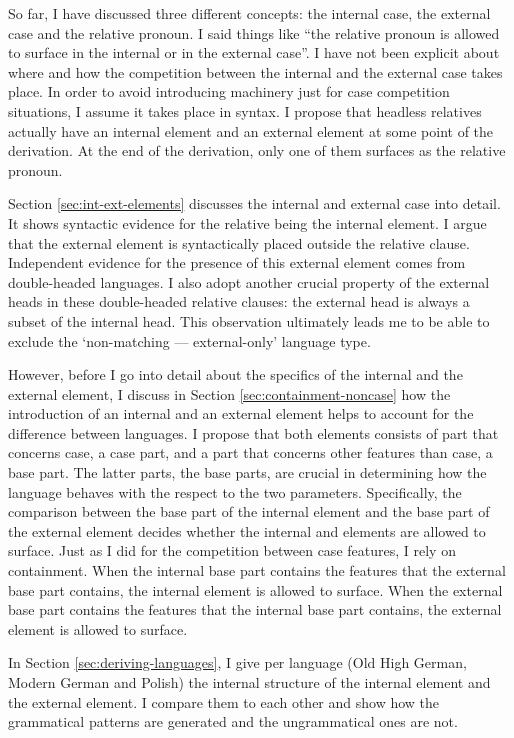 So far, I have discussed three different concepts: the internal case, the external case and the relative pronoun. I said things like ``the relative pronoun is allowed to surface in the internal or in the external case''. I have not been explicit about where and how the competition between the internal and the external case takes place. In order to avoid introducing machinery just for case competition situations, I assume it takes place in syntax. I propose that headless relatives actually have an internal element and an external element at some point of the derivation. At the end of the derivation, only one of them surfaces as the relative pronoun.

Section \ref{sec:int-ext-elements} discusses the internal and external case into detail. It shows syntactic evidence for the relative being the internal element. I argue that the external element is syntactically placed outside the relative clause. Independent evidence for the presence of this external element comes from double-headed languages. I also adopt another crucial property of the external heads in these double-headed relative clauses: the external head is always a subset of the internal head. This observation ultimately leads me to be able to exclude the `non-matching --- external-only' language type.

However, before I go into detail about the specifics of the internal and the external element, I discuss in Section \ref{sec:containment-noncase} how the introduction of an internal and an external element helps to account for the difference between languages. I propose that both elements consists of part that concerns case, a case part, and a part that concerns other features than case, a base part. The latter parts, the base parts, are crucial in determining how the language behaves with the respect to the two parameters. Specifically, the comparison between the base part of the internal element and the base part of the external element decides whether the internal and elements are allowed to surface. Just as I did for the competition between case features, I rely on containment. When the internal base part contains the features that the external base part contains, the internal element is allowed to surface. When the external base part contains the features that the internal base part contains, the external element is allowed to surface.

In Section \ref{sec:deriving-languages}, I give per language (Old High German, Modern German and Polish) the internal structure of the internal element and the external element. I compare them to each other and show how the grammatical patterns are generated and the ungrammatical ones are not.

